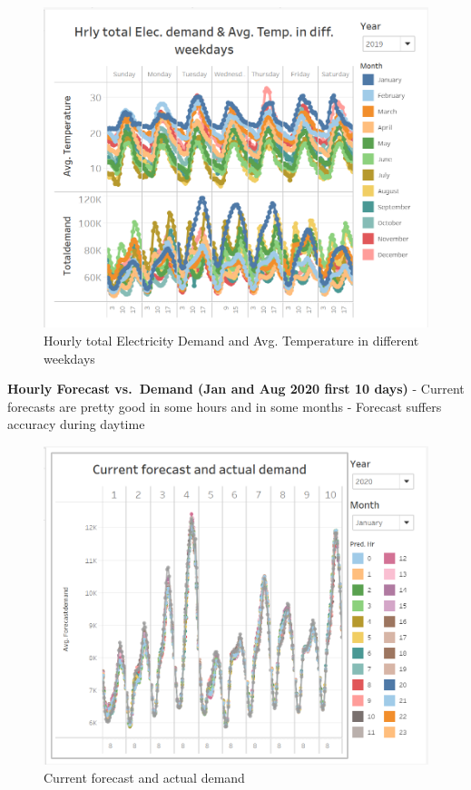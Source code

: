 \documentclass[mstat,12pt]{unswthesis}
\begin{document}
\begin{figure}[H]
\includegraphics{snapshots1/Slide 4 snapshot 2.png}
\caption{Hourly total Electricity Demand and Avg. Temperature in different weekdays}\label{4.5}
\end{figure}

\textbf{Hourly Forecast vs.~Demand (Jan and Aug 2020 first 10 days)}
\newline \newline - Current forecasts are pretty good in some hours and
in some months \newline - Forecast suffers accuracy during daytime
\newline

\begin{figure}[H]
\includegraphics{snapshots1/Slide 5 snapshot 1.png}
\caption{Current forecast and actual demand}\label{4.6}
\end{figure}
\end{document}
